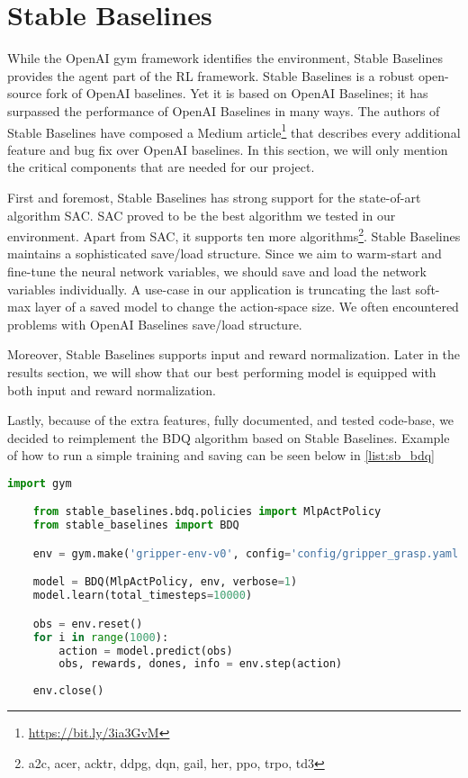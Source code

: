 \section{Stable Baselines}


While the OpenAI gym framework identifies the environment, Stable Baselines provides the agent part of the RL framework. Stable Baselines is a robust open-source fork of OpenAI baselines. Yet it is based on OpenAI Baselines; it has surpassed the performance of OpenAI Baselines in many ways. 
The authors of Stable Baselines have composed a Medium article\footnote{\url{https://bit.ly/3ia3GvM}} that describes every additional feature and bug fix over OpenAI baselines. In this section, we will only mention the critical components that are needed for our project.

First and foremost, Stable Baselines has strong support for the state-of-art algorithm SAC. SAC proved to be the best algorithm we tested in our environment. Apart from SAC, it supports ten more algorithms\footnote{a2c, 
acer, acktr, ddpg, dqn, gail, her, ppo, trpo, td3}. Stable Baselines maintains a sophisticated save/load structure. Since we aim to warm-start and fine-tune the neural network variables, we should save and load the network variables individually. A use-case in our application is truncating the last soft-max layer of a saved model to change the action-space size. We often encountered problems with OpenAI Baselines save/load structure.

Moreover, Stable Baselines supports input and reward normalization. Later in the results section, we will show that our best performing model is equipped with both input and reward normalization.

Lastly, because of the extra features, fully documented, and tested code-base, we decided to reimplement the BDQ algorithm based on Stable Baselines. Example of how to run a simple training and saving can be seen below in \ref{list:sb_bdq}


\begin{lstlisting}[language=Python, caption=Example of training and saving BDQ algorithm on gripper-env, label=list:sb_bdq]
    import gym

    from stable_baselines.bdq.policies import MlpActPolicy
    from stable_baselines import BDQ

    env = gym.make('gripper-env-v0', config='config/gripper_grasp.yaml')

    model = BDQ(MlpActPolicy, env, verbose=1)
    model.learn(total_timesteps=10000)

    obs = env.reset()
    for i in range(1000):
        action = model.predict(obs)
        obs, rewards, dones, info = env.step(action)
    
    env.close()
\end{lstlisting}
